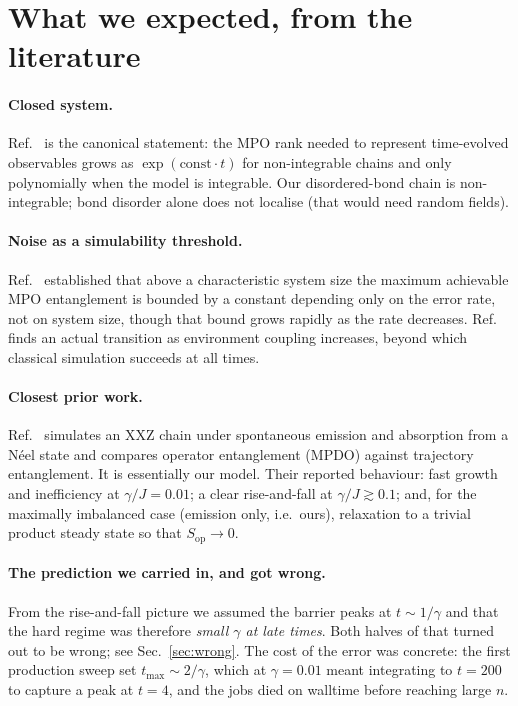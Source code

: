 \documentclass[11pt,a4paper]{article}
\newcommand{\Sop}{S_{\mathrm{op}}}
\begin{document}
\section{What we expected, from the literature}
\label{sec:lit}

\paragraph{Closed system.} Ref.~\cite{prosen2007integrability} is the canonical
statement: the MPO rank needed to represent time-evolved observables grows as
$\exp(\mathrm{const}\cdot t)$ for non-integrable chains and only polynomially
when the model is integrable. Our disordered-bond chain is non-integrable; bond
disorder alone does not localise (that would need random fields).

\paragraph{Noise as a simulability threshold.} Ref.~\cite{noh2020efficient}
established that above a characteristic system size the maximum achievable MPO
entanglement is bounded by a constant depending only on the error rate, not on
system size, though that bound grows rapidly as the rate decreases.
Ref.~\cite{azad2023phase} finds an actual transition as environment coupling
increases, beyond which classical simulation succeeds at all times.

\paragraph{Closest prior work.} Ref.~\cite{preisser2023comparing} simulates an
XXZ chain under spontaneous emission and absorption from a N\'eel state and
compares operator entanglement (MPDO) against trajectory entanglement. It is
essentially our model. Their reported behaviour: fast growth and inefficiency at
$\gamma/J=0.01$; a clear rise-and-fall at $\gamma/J\gtrsim0.1$; and, for the
maximally imbalanced case (emission only, i.e.\ ours), relaxation to a trivial
product steady state so that $\Sop\to0$.

\paragraph{The prediction we carried in, and got wrong.} From the rise-and-fall
picture we assumed the barrier peaks at $t\sim1/\gamma$ and that the hard regime
was therefore \emph{small $\gamma$ at late times}. Both halves of that turned
out to be wrong; see Sec.~\ref{sec:wrong}. The cost of the error was concrete:
the first production sweep set $t_{\max}\sim2/\gamma$, which at $\gamma=0.01$
meant integrating to $t=200$ to capture a peak at $t=4$, and the jobs died on
walltime before reaching large $n$.
\end{document}
